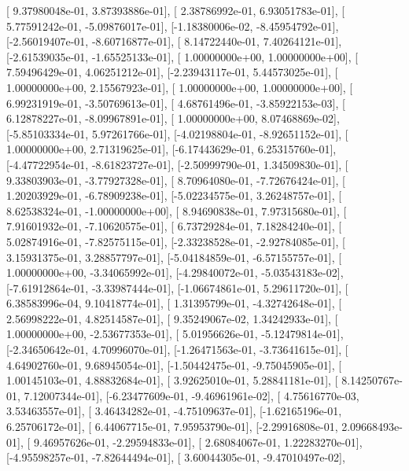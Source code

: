 \documentclass{article}
\begin{document}
       [ 9.37980048e-01,  3.87393886e-01],
       [ 2.38786992e-01,  6.93051783e-01],
       [ 5.77591242e-01, -5.09876017e-01],
       [-1.18380006e-02, -8.45954792e-01],
       [-2.56019407e-01, -8.60716877e-01],
       [ 8.14722440e-01,  7.40264121e-01],
       [-2.61539035e-01, -1.65525133e-01],
       [ 1.00000000e+00,  1.00000000e+00],
       [ 7.59496429e-01,  4.06251212e-01],
       [-2.23943117e-01,  5.44573025e-01],
       [ 1.00000000e+00,  2.15567923e-01],
       [ 1.00000000e+00,  1.00000000e+00],
       [ 6.99231919e-01, -3.50769613e-01],
       [ 4.68761496e-01, -3.85922153e-03],
       [ 6.12878227e-01, -8.09967891e-01],
       [ 1.00000000e+00,  8.07468869e-02],
       [-5.85103334e-01,  5.97261766e-01],
       [-4.02198804e-01, -8.92651152e-01],
       [ 1.00000000e+00,  2.71319625e-01],
       [-6.17443629e-01,  6.25315760e-01],
       [-4.47722954e-01, -8.61823727e-01],
       [-2.50999790e-01,  1.34509830e-01],
       [ 9.33803903e-01, -3.77927328e-01],
       [ 8.70964080e-01, -7.72676424e-01],
       [ 1.20203929e-01, -6.78909238e-01],
       [-5.02234575e-01,  3.26248757e-01],
       [ 8.62538324e-01, -1.00000000e+00],
       [ 8.94690838e-01,  7.97315680e-01],
       [ 7.91601932e-01, -7.10620575e-01],
       [ 6.73729284e-01,  7.18284240e-01],
       [ 5.02874916e-01, -7.82575115e-01],
       [-2.33238528e-01, -2.92784085e-01],
       [ 3.15931375e-01,  3.28857797e-01],
       [-5.04184859e-01, -6.57155757e-01],
       [ 1.00000000e+00, -3.34065992e-01],
       [-4.29840072e-01, -5.03543183e-02],
       [-7.61912864e-01, -3.33987444e-01],
       [-1.06674861e-01,  5.29611720e-01],
       [ 6.38583996e-04,  9.10418774e-01],
       [ 1.31395799e-01, -4.32742648e-01],
       [ 2.56998222e-01,  4.82514587e-01],
       [ 9.35249067e-02,  1.34242933e-01],
       [ 1.00000000e+00, -2.53677353e-01],
       [ 5.01956626e-01, -5.12479814e-01],
       [-2.34650642e-01,  4.70996070e-01],
       [-1.26471563e-01, -3.73641615e-01],
       [ 4.64902760e-01,  9.68945054e-01],
       [-1.50442475e-01, -9.75045905e-01],
       [ 1.00145103e-01,  4.88832684e-01],
       [ 3.92625010e-01,  5.28841181e-01],
       [ 8.14250767e-01,  7.12007344e-01],
       [-6.23477609e-01, -9.46961961e-02],
       [ 4.75616770e-03,  3.53463557e-01],
       [ 3.46434282e-01, -4.75109637e-01],
       [-1.62165196e-01,  6.25706172e-01],
       [ 6.44067715e-01,  7.95953790e-01],
       [-2.29916808e-01,  2.09668493e-01],
       [ 9.46957626e-01, -2.29594833e-01],
       [ 2.68084067e-01,  1.22283270e-01],
       [-4.95598257e-01, -7.82644494e-01],
       [ 3.60044305e-01, -9.47010497e-02],
\end{document}
